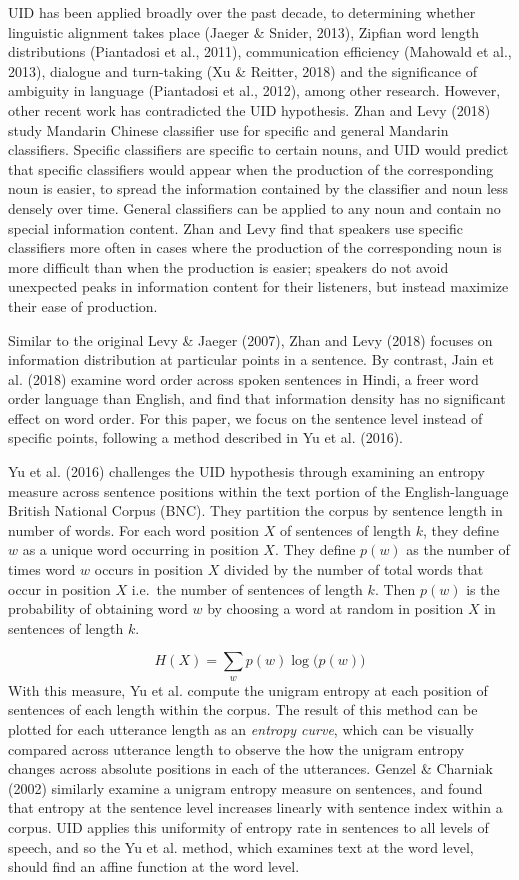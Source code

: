 \documentclass[10pt, letterpaper]{article}
\begin{document}
UID has been applied broadly over the past decade, to determining
whether linguistic alignment takes place (Jaeger \& Snider, 2013),
Zipfian word length distributions (Piantadosi et al., 2011),
communication efficiency (Mahowald et al., 2013), dialogue and
turn-taking (Xu \& Reitter, 2018) and the significance of ambiguity in
language (Piantadosi et al., 2012), among other research. However, other
recent work has contradicted the UID hypothesis. Zhan and Levy (2018)
study Mandarin Chinese classifier use for specific and general Mandarin
classifiers. Specific classifiers are specific to certain nouns, and UID
would predict that specific classifiers would appear when the production
of the corresponding noun is easier, to spread the information contained
by the classifier and noun less densely over time. General classifiers
can be applied to any noun and contain no special information content.
Zhan and Levy find that speakers use specific classifiers more often in
cases where the production of the corresponding noun is more difficult
than when the production is easier; speakers do not avoid unexpected
peaks in information content for their listeners, but instead maximize
their ease of production.

Similar to the original Levy \& Jaeger (2007), Zhan and Levy (2018)
focuses on information distribution at particular points in a sentence.
By contrast, Jain et al. (2018) examine word order across spoken
sentences in Hindi, a freer word order language than English, and find
that information density has no significant effect on word order. For
this paper, we focus on the sentence level instead of specific points,
following a method described in Yu et al. (2016).

Yu et al. (2016) challenges the UID hypothesis through examining an
entropy measure across sentence positions within the text portion of the
English-language British National Corpus (BNC). They partition the
corpus by sentence length in number of words. For each word position
\(X\) of sentences of length \(k\), they define \(w\) as a unique word
occurring in position \(X\). They define \(p(w)\) as the number of times
word \(w\) occurs in position \(X\) divided by the number of total words
that occur in position \(X\) i.e.~the number of sentences of length
\(k\). Then \(p(w)\) is the probability of obtaining word \(w\) by
choosing a word at random in position \(X\) in sentences of length
\(k\).

\[H(X) = \sum\limits_w p(w)\log\big(p(w)\big)\] With this measure, Yu et
al. compute the unigram entropy at each position of sentences of each
length within the corpus. The result of this method can be plotted for
each utterance length as an \emph{entropy curve}, which can be visually
compared across utterance length to observe the how the unigram entropy
changes across absolute positions in each of the utterances. Genzel \&
Charniak (2002) similarly examine a unigram entropy measure on
sentences, and found that entropy at the sentence level increases
linearly with sentence index within a corpus. UID applies this
uniformity of entropy rate in sentences to all levels of speech, and so
the Yu et al. method, which examines text at the word level, should find
an affine function at the word level.
\end{document}
